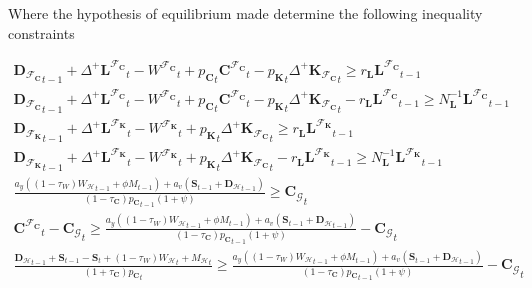 \documentclass[a4paper, headings=standardclasses]{scrartcl}
\numberwithin{equation}{subsection}
\begin{document}
Where the hypothesis of equilibrium made determine the following inequality constraints

{\allowdisplaybreaks \tiny
	\begin{gather}
		{\mathbf{D}_{\mathcal{F}_\mathbf{C}}}_{t-1} + {\Delta^+{\mathbf{L}^{\mathcal{F}_\mathbf{C}}}}_t - {W^{\mathcal{F}_\mathbf{C}}}_t + {p_{\mathbf{C}}}_t {\mathbf{C}^{\mathcal{F}_\mathbf{C}}}_t - {p_{\mathbf{K}}}_t {\Delta^+{\mathbf{K}_{\mathcal{F}_\mathbf{C}}}}_t \ge r_\mathbf{L} {\mathbf{L}^{\mathcal{F}_\mathbf{C}}}_{t-1} \\
		{\mathbf{D}_{\mathcal{F}_\mathbf{C}}}_{t-1} + {\Delta^+{\mathbf{L}^{\mathcal{F}_\mathbf{C}}}}_t - {W^{\mathcal{F}_\mathbf{C}}}_t + {p_{\mathbf{C}}}_t {\mathbf{C}^{\mathcal{F}_\mathbf{C}}}_t - {p_{\mathbf{K}}}_t {\Delta^+{\mathbf{K}_{\mathcal{F}_\mathbf{C}}}}_t - r_\mathbf{L} {\mathbf{L}^{\mathcal{F}_\mathbf{C}}}_{t-1} \ge N_\mathbf{L}^{-1} {\mathbf{L}^{\mathcal{F}_\mathbf{C}}}_{t-1} \\
		{\mathbf{D}_{\mathcal{F}_\mathbf{K}}}_{t-1} + {\Delta^+{\mathbf{L}^{\mathcal{F}_\mathbf{K}}}}_t - {W^{\mathcal{F}_\mathbf{K}}}_t +  {p_{\mathbf{K}}}_t {\Delta^+{\mathbf{K}_{\mathcal{F}_\mathbf{C}}}}_t \ge r_\mathbf{L} {\mathbf{L}^{\mathcal{F}_\mathbf{K}}}_{t-1} \\
		{\mathbf{D}_{\mathcal{F}_\mathbf{K}}}_{t-1} + {\Delta^+{\mathbf{L}^{\mathcal{F}_\mathbf{K}}}}_t - {W^{\mathcal{F}_\mathbf{K}}}_t +  {p_{\mathbf{K}}}_t {\Delta^+{\mathbf{K}_{\mathcal{F}_\mathbf{C}}}}_t - {r_\mathbf{L}} {\mathbf{L}^{\mathcal{F}_\mathbf{K}}}_{t-1} \ge N_\mathbf{L}^{-1} {\mathbf{L}^{\mathcal{F}_\mathbf{K}}}_{t-1} \\
		\frac{a_y ((1-\tau_W) {W_\mathcal{H}}_{t-1} + \phi M_{t-1}) + a_v (\mathbf{S}_{t-1} + {\mathbf{D}_\mathcal{H}}_{t-1})}{{(1-\tau_\mathbf{C}) p_\mathbf{C}}_{t-1} (1+\psi)} \ge {\mathbf{C}_\mathcal{G}}_t \\
		{\mathbf{C}^{\mathcal{F}_\mathbf{C}}}_t - {\mathbf{C}_\mathcal{G}}_t \ge \frac{a_y ((1-\tau_W) {W_\mathcal{H}}_{t-1} + \phi M_{t-1}) + a_v (\mathbf{S}_{t-1} + {\mathbf{D}_\mathcal{H}}_{t-1})}{{(1-\tau_\mathbf{C}) p_\mathbf{C}}_{t-1} (1+\psi)} - {\mathbf{C}_\mathcal{G}}_t\\
		\frac{{\mathbf{D}_\mathcal{H}}_{t-1} + \mathbf{S}_{t-1} - \mathbf{S}_t + (1 - \tau_W){W_\mathcal{H}} _t + {M_\mathcal{H}} _t}{(1+\tau_{\mathbf{C}}){p_\mathbf{C}}_t} \ge \frac{a_y ((1-\tau_W) {W_\mathcal{H}}_{t-1} + \phi M_{t-1}) + a_v (\mathbf{S}_{t-1} + {\mathbf{D}_\mathcal{H}}_{t-1})}{{(1-\tau_\mathbf{C}) p_\mathbf{C}}_{t-1} (1+\psi)} - {\mathbf{C}_\mathcal{G}}_t\\

\end{gather}}
\end{document}
